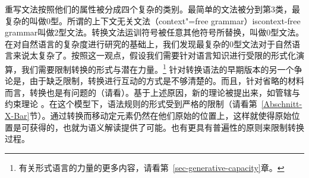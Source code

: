 重写文法按照他们的属性被分成四个复杂的类别。最简单的文法被分到第3类，最复杂的叫做0型。所谓的上下文无关文法（context"=free grammar）is{context-free grammar}叫做2型文法。转换文法运训符号被任意其他符号所替换，叫做0型文法\citep{PR73a-u}。\label{page-TG-Typ0}在对自然语言的复杂度进行研究的基础上，我们发现最复杂的0型文法对于自然语言来说太复杂了。按照这一观点，假设我们需要针对语言知识进行受限的形式化演算\citep[]{Chomsky65a}，我们需要限制转换的形式与潜在力量。\footnote{
    有关形式语言的力量的更多内容，请看第~\ref{sec-generative-capacity}章。
} 
针对转换语法的早期版本的另一个争论是，由于缺乏限制，转换进行互动的方式是不够清楚的。而且，针对省略的材料而言，转换也是有问题的（请看\citealp[Section~3.1.4]{Klenk2003a}）。基于上述原因，新的理论被提出来，如管辖与约束理论\citep{Chomsky81a} 。在这个模型下，语法规则的形式受到严格的限制（请看第~\ref{Abschnitt-X-Bar}节）。通过转换而移动定元素仍然在他们原始的位置上，这样就使得原始位置是可获得的，也就为语义解读提供了可能。也有更具有普遍性的原则来限制转换过程。

